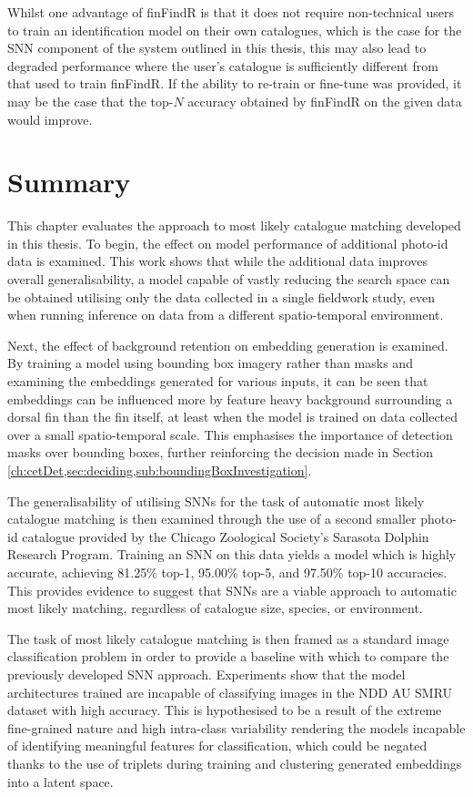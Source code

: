 Whilst one advantage of finFindR is that it does not require non-technical users to train an identification model on their own catalogues, which is the case for the SNN component of the system outlined in this thesis, this may also lead to degraded performance where the user's catalogue is sufficiently different from that used to train finFindR. If the ability to re-train or fine-tune was provided, it may be the case that the top-$N$ accuracy obtained by finFindR on the given data would improve.

\section{Summary}\label{ch:SNNEvaluation,sec:Summary}

This chapter evaluates the approach to most likely catalogue matching developed in this thesis. To begin, the effect on model performance of additional photo-id data is examined. This work shows that while the additional data improves overall generalisability, a model capable of vastly reducing the search space can be obtained utilising only the data collected in a single fieldwork study, even when running inference on data from a different spatio-temporal environment.

Next, the effect of background retention on embedding generation is examined. By training a model using bounding box imagery rather than masks and examining the embeddings generated for various inputs, it can be seen that embeddings can be influenced more by feature heavy background surrounding a dorsal fin than the fin itself, at least when the model is trained on data collected over a small spatio-temporal scale. This emphasises the importance of detection masks over bounding boxes, further reinforcing the decision made in Section \ref{ch:cetDet,sec:deciding,sub:boundingBoxInvestigation}.

The generalisability of utilising SNNs for the task of automatic most likely catalogue matching is then examined through the use of a second smaller photo-id catalogue provided by the Chicago Zoological Society's Sarasota Dolphin Research Program. Training an SNN on this data yields a model which is highly accurate, achieving 81.25\% top-1, 95.00\% top-5, and 97.50\% top-10 accuracies. This provides evidence to suggest that SNNs are a viable approach to automatic most likely matching, regardless of catalogue size, species, or environment.

The task of most likely catalogue matching is then framed as a standard image classification problem in order to provide a baseline with which to compare the previously developed SNN approach. Experiments show that the model architectures trained are incapable of classifying images in the NDD AU SMRU dataset with high accuracy. This is hypothesised to be a result of the extreme fine-grained nature and high intra-class variability rendering the models incapable of identifying meaningful features for classification, which could be negated thanks to the use of triplets during training and clustering generated embeddings into a latent space.

